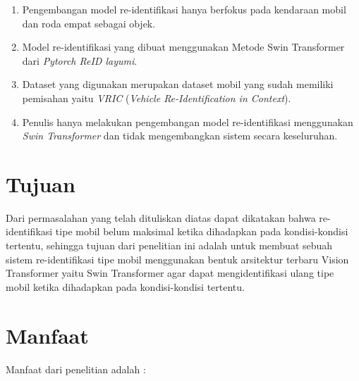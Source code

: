\begin{enumerate}[nolistsep]

      \item Pengembangan model re-identifikasi hanya berfokus pada kendaraan mobil dan roda empat sebagai objek.

      \item Model re-identifikasi yang dibuat menggunakan Metode Swin Transformer dari \emph{Pytorch 
      ReID layumi}.

      \item Dataset yang digunakan merupakan dataset mobil yang sudah memiliki pemisahan yaitu \emph{VRIC}
      (\emph{Vehicle Re-Identification in Context}).

      \item Penulis hanya melakukan pengembangan model re-identifikasi menggunakan \emph{Swin Transformer} dan tidak 
      mengembangkan sistem secara keseluruhan.

\end{enumerate}

\section{Tujuan}
\label{sec:Tujuan}

Dari permasalahan yang telah dituliskan diatas dapat dikatakan bahwa re-identifikasi tipe mobil belum maksimal
ketika dihadapkan pada kondisi-kondisi tertentu, sehingga tujuan dari penelitian ini adalah untuk membuat
sebuah sistem re-identifikasi tipe mobil menggunakan bentuk arsitektur terbaru Vision Transformer yaitu 
Swin Transformer agar dapat mengidentifikasi ulang tipe mobil ketika dihadapkan pada kondisi-kondisi tertentu.


\section{Manfaat}
\label{sec:manfaat}

Manfaat dari penelitian adalah :

